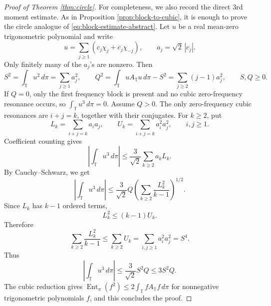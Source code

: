 \documentclass[11pt]{amsart}
\numberwithin{equation}{section}
\theoremstyle{plain}
\theoremstyle{remark}
\newcommand{\Zn}[1]{\mathbb Z_{#1}}
\newcommand{\psin}{\psi_n}
\newcommand{\coef}{c}
\newcommand{\Ssymbol}{S}
\newcommand{\Qsymbol}{Q}
\newcommand{\Ssq}{\Ssymbol^2}
\newcommand{\Qsq}{\Qsymbol^2}
\newcommand{\Sfour}{\Ssymbol^4}
\newcommand{\TT}{\mathbb T}
\newcommand{\muT}{\pi}
\newcommand{\AT}{A_{\TT}}
\newcommand{\AvgT}[1]{\int_{\TT} #1\,d\muT}
\newcommand{\EntT}[1]{\operatorname{Ent}_{\muT}\!\left(#1\right)}
\newcommand{\abs}[1]{\left|#1\right|}
\begin{document}
\begin{proof}[Proof of Theorem \ref{thm:circle}]

For completeness, we also record the direct 3rd moment estimate.  As in
Proposition \ref{prop:block-to-cubic}, it is enough to prove the circle analogue
of \eqref{eq:block-estimate-abstract}.  Let \(u\) be a real mean-zero
trigonometric polynomial and write
\[
  u=\sum_{j\ge1}\left(\coef_j\chi_j+\overline{\coef_j}\chi_{-j}\right),
  \qquad a_j=\sqrt2\,\abs{\coef_j}.
\]
Only finitely many of the \(a_j\)'s are nonzero.  Then
\[
  \Ssq=\AvgT{u^2}=\sum_{j\ge1}a_j^2,
  \qquad
  \Qsq=\AvgT{u\AT u}-\Ssq=\sum_{j\ge2}(j-1)a_j^2,
  \qquad \Ssymbol,\Qsymbol\ge0.
\]
If \(\Qsymbol=0\), only the first frequency block is present and no cubic
zero-frequency resonance occurs, so \(\AvgT{u^3}=0\).  Assume \(\Qsymbol>0\).
The only zero-frequency cubic resonances are \(i+j=k\), together with their
conjugates.  For \(k\ge2\), put
\[
  L_k=\sum_{i+j=k}a_i a_j,
  \qquad
  U_k=\sum_{i+j=k}a_i^2a_j^2,
  \qquad i,j\ge1.
\]
Coefficient counting gives
\[
  \abs{\AvgT{u^3}}
  \le \frac3{\sqrt2}\sum_{k\ge2}a_kL_k.
\]
By Cauchy--Schwarz, we get
\[
  \abs{\AvgT{u^3}}
  \le \frac3{\sqrt2}\Qsymbol
  \left(\sum_{k\ge2}\frac{L_k^2}{k-1}\right)^{1/2}.
\]
Since \(L_k\) has \(k-1\) ordered terms,
\[
  L_k^2\le (k-1)U_k.
\]
Therefore
\[
  \sum_{k\ge2}\frac{L_k^2}{k-1}
  \le \sum_{k\ge2}U_k
  =\sum_{i,j\ge1}a_i^2a_j^2=\Sfour.
\]
Thus
\[
  \abs{\AvgT{u^3}}
  \le \frac3{\sqrt2}\Ssq\Qsymbol
  \le 3\Ssq\Qsymbol.
\]
The cubic reduction gives \(\EntT{f^2}\le2\AvgT{f\AT f}\) for nonnegative
trigonometric polynomials \(f\), and this concludes the proof.
\end{proof}
\end{document}
